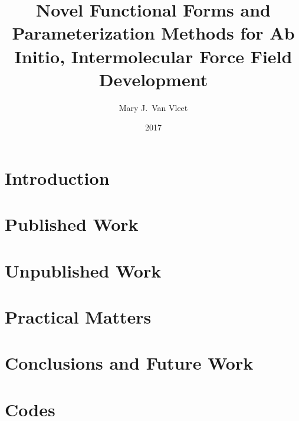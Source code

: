 \documentclass[12pt,oneside,letterpaper]{memoir}
\title{
Novel Functional Forms and Parameterization Methods for Ab Initio, Intermolecular Force Field Development
}
\author{Mary J.~Van Vleet}
\date{2017}
\begin{document}

\ifpdf
{}
\else
{}
\fi

\maketitle
\restoregeometry %




\part{Introduction}
\glsresetall %



\part{Published Work}
\glsresetall 

\glsresetall 


\part{Unpublished Work}
\glsresetall 

\glsresetall 


\part{Practical Matters}



\part{Conclusions and Future Work}



\part{Codes}

% 
\end{document}
